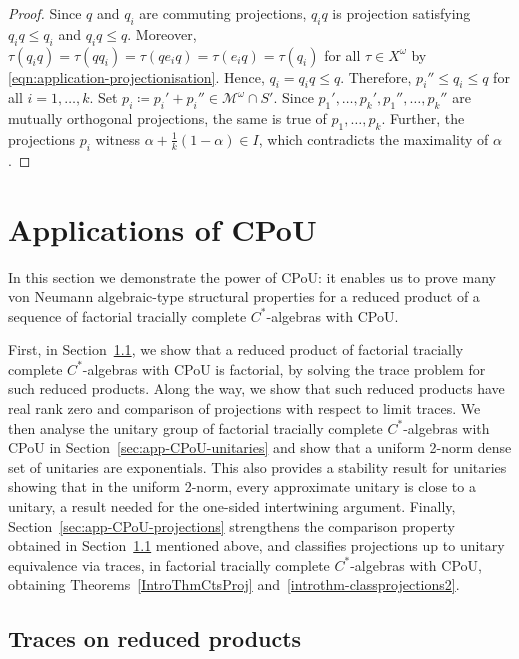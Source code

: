 \documentclass[a4paper,11pt]{amsart}
\theoremstyle{definition}
\numberwithin{equation}{section}
\numberwithin{theorem}{section}
\newcommand{\M}{\mathcal{M}}
\begin{document}
\begin{proof}
Since $q$ and $q_i$ are commuting projections, $q_iq$ is projection satisfying $q_iq \leq q_i$ and $q_iq \leq q$.
Moreover, $\tau(q_iq) = \tau(qq_i) = \tau (qe_iq) = \tau(e_iq) = \tau(q_i)$ for all $\tau \in X^\omega$ by \eqref{eqn:application-projectionisation}.
Hence, $q_i = q_iq \leq q$.  
Therefore, $p_i'' \leq q_i \leq q$ for all $i = 1, \ldots, k$.  
Set $p_i \coloneqq p_i' + p_i'' \in \M^\omega \cap S'$.
Since $p_1',\dots,p_k',p_1'',\dots,p_k''$ are mutually orthogonal projections, the same is true of $p_1,\dots,p_k$. 
Further, the projections $p_i$ witness $\alpha + \frac1k (1 - \alpha) \in I$, which contradicts the maximality of $\alpha$.  
\end{proof}


\section{Applications of CPoU}\label{sec:app-CPoU}

In this section we demonstrate the power of CPoU: it enables us to prove many von Neumann algebraic-type structural properties for a reduced product of a sequence of factorial tracially complete $C^*$-algebras with CPoU.

First, in Section~\ref{sec:app-CPoU-traces}, we show that a reduced product of factorial tracially complete $C^*$-algebras with CPoU is factorial, by solving the trace problem for such reduced products. Along the way, we show that such reduced products have real rank zero and comparison of projections with respect to limit traces.  We then analyse the unitary group of factorial tracially complete $C^*$-algebras with CPoU in Section~\ref{sec:app-CPoU-unitaries} and show that a uniform 2-norm dense set of unitaries are exponentials.  This also provides a stability result for unitaries showing that in the uniform 2-norm, every approximate unitary is close to a unitary, a result needed for the one-sided intertwining argument.  Finally, Section~\ref{sec:app-CPoU-projections} strengthens the comparison property obtained in Section~\ref{sec:app-CPoU-traces} mentioned above, and classifies projections up to unitary equivalence via traces, in factorial tracially complete $C^*$-algebras with CPoU, obtaining Theorems~\ref{IntroThmCtsProj} and~\ref{introthm-classprojections2}.


\subsection{Traces on reduced products}\label{sec:app-CPoU-traces}
\end{document}
